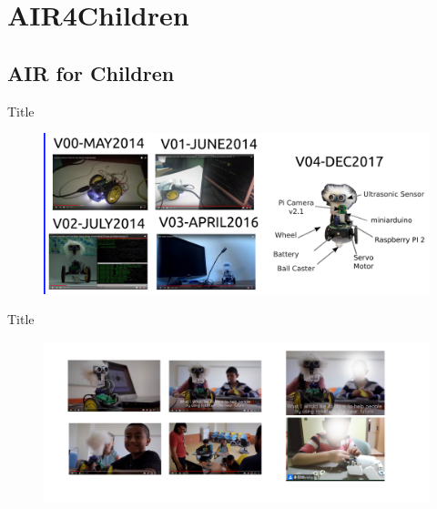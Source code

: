 \section{AIR4Children}

\subsection{AIR for Children}

{
\begin{frame}{Title}
      \begin{figure}
        \centering
        \includegraphics[width=1.0\textwidth]{./figures/air4children/versions/drawing-v00.png}
      \end{figure}
\end{frame}
}

{
\begin{frame}{Title}
      \begin{figure}
        \centering
        \includegraphics[width=1.0\textwidth]{./figures/air4children/versions/drawing-v01.png}
      \end{figure}
\end{frame}
}

